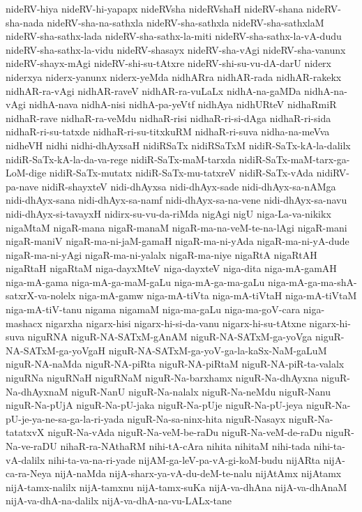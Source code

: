 {nideRV-hiya
nideRV-hi-yapapx
nideRVsha
nideRVshaH
nideRV-shana
nideRV-sha-nada
nideRV-sha-na-sathxla
nideRV-sha-sathxla
nideRV-sha-sathxlaM
nideRV-sha-sathx-lada
nideRV-sha-sathx-la-miti
nideRV-sha-sathx-la-vA-dudu
nideRV-sha-sathx-la-vidu
nideRV-shasayx
nideRV-sha-vAgi
nideRV-sha-vanunx
nideRV-shayx-mAgi
nideRV-shi-su-tAtxre
nideRV-shi-su-vu-dA-darU
niderx
niderxya
niderx-yanunx
niderx-yeMda
nidhARra
nidhAR-rada
nidhAR-rakekx
nidhAR-ra-vAgi
nidhAR-raveV
nidhAR-ra-vuLaLx
nidhA-na-gaMDa
nidhA-na-vAgi
nidhA-nava
nidhA-nisi
nidhA-pa-yeVtf
nidhAya
nidhURteV
nidhaRmiR
nidhaR-rave
nidhaR-ra-veMdu
nidhaR-risi
nidhaR-ri-si-dAga
nidhaR-ri-sida
nidhaR-ri-su-tatxde
nidhaR-ri-su-titxkuRM
nidhaR-ri-suva
nidha-na-meVva
nidheVH
nidhi
nidhi-dhAyxsaH
nidiRSaTx
nidiRSaTxM
nidiR-SaTx-kA-la-dalilx
nidiR-SaTx-kA-la-da-va-rege
nidiR-SaTx-maM-tarxda
nidiR-SaTx-maM-tarx-ga-LoM-dige
nidiR-SaTx-mutatx
nidiR-SaTx-mu-tatxreV
nidiR-SaTx-vAda
nidiRV-pa-nave
nidiR-shayxteV
nidi-dhAyxsa
nidi-dhAyx-sade
nidi-dhAyx-sa-nAMga
nidi-dhAyx-sana
nidi-dhAyx-sa-namf
nidi-dhAyx-sa-na-vene
nidi-dhAyx-sa-navu
nidi-dhAyx-si-tavayxH
nidirx-su-vu-da-riMda
nigAgi
nigU
niga-La-va-nikikx
nigaMtaM
nigaR-mana
nigaR-manaM
nigaR-ma-na-veM-te-na-lAgi
nigaR-mani
nigaR-maniV
nigaR-ma-ni-jaM-gamaH
nigaR-ma-ni-yAda
nigaR-ma-ni-yA-dude
nigaR-ma-ni-yAgi
nigaR-ma-ni-yalalx
nigaR-ma-niye
nigaRtA
nigaRtAH
nigaRtaH
nigaRtaM
niga-dayxMteV
niga-dayxteV
niga-dita
niga-mA-gamAH
niga-mA-gama
niga-mA-ga-maM-gaLu
niga-mA-ga-ma-gaLu
niga-mA-ga-ma-shA-satxrX-va-nolelx
niga-mA-gamw
niga-mA-tiVta
niga-mA-tiVtaH
niga-mA-tiVtaM
niga-mA-tiV-tanu
nigama
nigamaM
niga-ma-gaLu
niga-ma-goV-cara
niga-mashacx
nigarxha
nigarx-hisi
nigarx-hi-si-da-vanu
nigarx-hi-su-tAtxne
nigarx-hi-suva
niguRNA
niguR-NA-SATxM-gAnAM
niguR-NA-SATxM-ga-yoVga
niguR-NA-SATxM-ga-yoVgaH
niguR-NA-SATxM-ga-yoV-ga-la-kaSx-NaM-gaLuM
niguR-NA-naMda
niguR-NA-piRta
niguR-NA-piRtaM
niguR-NA-piR-ta-valalx
niguRNa
niguRNaH
niguRNaM
niguR-Na-barxhamx
niguR-Na-dhAyxna
niguR-Na-dhAyxnaM
niguR-NanU
niguR-Na-nalalx
niguR-Na-neMdu
niguR-Nanu
niguR-Na-pUjA
niguR-Na-pU-jaka
niguR-Na-pUje
niguR-Na-pU-jeya
niguR-Na-pU-je-ya-ne-sa-ga-la-ri-yada
niguR-Na-sa-ninx-hita
niguR-Nasayx
niguR-Na-tatatxvX
niguR-Na-vAda
niguR-Na-veM-be-raDu
niguR-Na-veM-de-raDu
niguR-Na-ve-raDU
nihaR-ra-NAthaRM
nihi-tA-cAra
nihita
nihitaM
nihi-tada
nihi-ta-vA-dalilx
nihi-ta-va-na-ri-yade
nijAM-ga-leV-pa-vA-gi-koM-budu
nijARta
nijA-ca-ra-Neya
nijA-naMda
nijA-sharx-ya-vA-du-deM-te-nalu
nijAtAmx
nijAtamx
nijA-tamx-nalilx
nijA-tamxnu
nijA-tamx-suKa
nijA-va-dhAna
nijA-va-dhAnaM
nijA-va-dhA-na-dalilx
nijA-va-dhA-na-vu-LALx-tane
}
